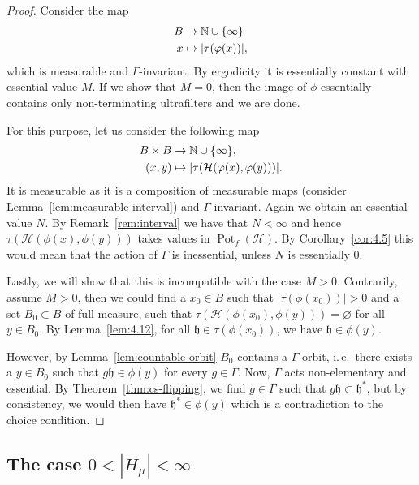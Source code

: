 \begin{proof}
  Consider the map
  \begin{align*}
    B & \to \mathbb{N} \cup \{\infty\}\\
    x & \mapsto |\tau(\varphi(x))|,
  \end{align*}
  which is measurable and \(\Gamma\)-invariant. By ergodicity it is essentially constant with essential value \(M\). If we show that \(M = 0\), then the image of \(\phi\) essentially contains only non-terminating ultrafilters and we are done.

  For this purpose, let us consider the following map
  \begin{align*}
    B \times B & \to \mathbb{N} \cup \{\infty\},\\
    (x,y) & \mapsto |\tau(\mathcal{H}(\varphi(x), \varphi(y)))|.
  \end{align*}
  It is measurable as it is a composition of measurable maps (consider Lemma~\ref{lem:measurable-interval}) and \(\Gamma\)-invariant. Again we obtain an essential value \(N\). By Remark~\ref{rem:interval} we have that \(N < \infty\) and hence \(\tau(\mathcal{H}(\phi(x), \phi(y)))\) takes values in \(\operatorname{Pot}_f(\mathcal{H})\). By Corollary~\ref{cor:4.5} this would mean that the action of \(\Gamma\) is inessential, unless \(N\) is essentially 0.

  Lastly, we will show that this is incompatible with the case \(M > 0\). Contrarily, assume \(M > 0\), then we could find a \(x_0 \in B\) such that \(|\tau(\phi(x_0))| > 0\) and a set \(B_0 \subset B\) of full measure, such that \(\tau(\mathcal{H}(\phi(x_0), \phi(y))) = \varnothing\) for all \(y \in B_0\). By Lemma~\ref{lem:4.12}, for all \(\mathfrak{h} \in \tau(\phi(x_0))\), we have \(\mathfrak{h} \in \phi(y)\).

  However, by Lemma~\ref{lem:countable-orbit} \(B_0\) contains a \(\Gamma\)-orbit, i.\,e.\ there exists a \(y \in B_0\) such that \(g\mathfrak{h} \in \phi(y)\) for every \(g \in \Gamma\). Now, \(\Gamma\) acts non-elementary and essential. By Theorem~\ref{thm:cs-flipping}, we find \(g \in \Gamma\) such that \(g\mathfrak{h} \subset \mathfrak{h}^\ast\), but by consistency, we would then have \(\mathfrak{h}^\ast \in \phi(y)\) which is a contradiction to the choice condition.
\end{proof}

\subsection{The case \(0 < |H_\mu| < \infty\)}
\label{sec:N=finite}

